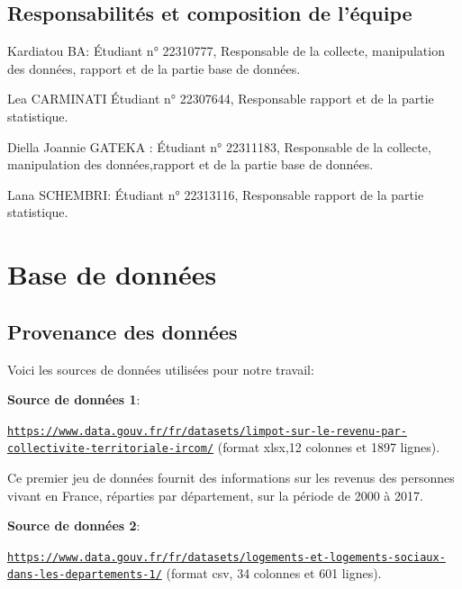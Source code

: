 \documentclass[mstat,12pt]{unswthesis}
\begin{document}
\section{Responsabilités et composition de
l'équipe}\label{responsabilituxe9s-et-composition-de-luxe9quipe}

\medskip

Kardiatou BA: Étudiant n° 22310777, Responsable de la collecte,
manipulation des données, rapport et de la partie base de données.

\medskip

Lea CARMINATI Étudiant n° 22307644, Responsable rapport et de la partie
statistique.

\medskip

Diella Joannie GATEKA : Étudiant n° 22311183, Responsable de la
collecte, manipulation des données,rapport et de la partie base de
données.

\medskip

Lana SCHEMBRI: Étudiant n° 22313116, Responsable rapport de la partie
statistique.

\chapter{Base de données}\label{base-de-donnuxe9es}

\section{Provenance des données}\label{provenance-des-donnuxe9es}

Voici les sources de données utilisées pour notre travail:

\textbf{Source de données 1}:

\tiny

\texttt{\url{https://www.data.gouv.fr/fr/datasets/limpot-sur-le-revenu-par-collectivite-territoriale-ircom/}}
\normalsize (format xlsx,12 colonnes et 1897 lignes).

Ce premier jeu de données fournit des informations sur les revenus des
personnes vivant en France, réparties par département, sur la période de
2000 à 2017.

\bigskip

\textbf{Source de données 2}:

\tiny

\texttt{\url{https://www.data.gouv.fr/fr/datasets/logements-et-logements-sociaux-dans-les-departements-1/}}
\normalsize (format csv, 34 colonnes et 601 lignes).
\end{document}
